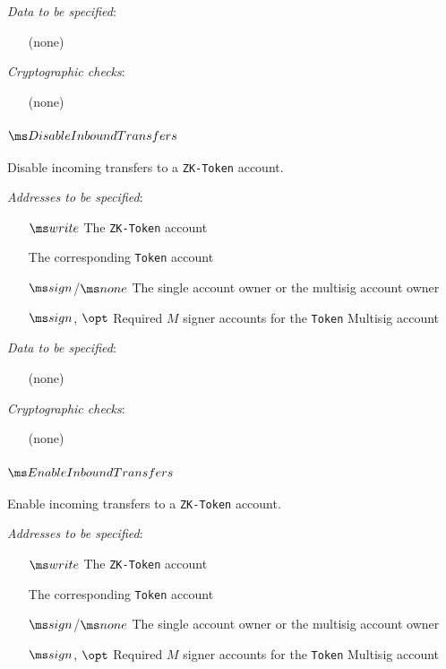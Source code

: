 \noindent
\textit{Data to be specified}:
\begin{itemize}
  \item[] (none)
\end{itemize}

\noindent
\textit{Cryptographic checks}:
\begin{itemize}
  \item[] (none)
\end{itemize}



\newpage
\subsubsection{$\DisableInboundTransfers$}
Disable incoming transfers to a \texttt{ZK-Token} account.
\vspace{0.5em}

\noindent
\textit{Addresses to be specified}:
\begin{itemize}[leftmargin=2.5cm]
  \item[$\writable$] The \texttt{ZK-Token} account
  \item[] The corresponding \texttt{Token} account
  \item[$\signer$/$\none$] The single account owner or the multisig account owner
  \item[$\signer$, $\opt$] Required $M$ signer accounts for the \texttt{Token}
    Multisig account
\end{itemize}

\noindent
\textit{Data to be specified}:
\begin{itemize}
  \item[] (none)
\end{itemize}

\noindent
\textit{Cryptographic checks}:
\begin{itemize}
  \item[] (none)
\end{itemize}


\newpage
\subsubsection{$\EnableInboundTransfers$}
Enable incoming transfers to a \texttt{ZK-Token} account.
\vspace{0.5em}

\noindent
\textit{Addresses to be specified}:
\begin{itemize}[leftmargin=2.5cm]
  \item[$\writable$] The \texttt{ZK-Token} account
  \item[] The corresponding \texttt{Token} account
  \item[$\signer$/$\none$] The single account owner or the multisig account owner
  \item[$\signer$, $\opt$] Required $M$ signer accounts for the \texttt{Token}
    Multisig account
\end{itemize}

